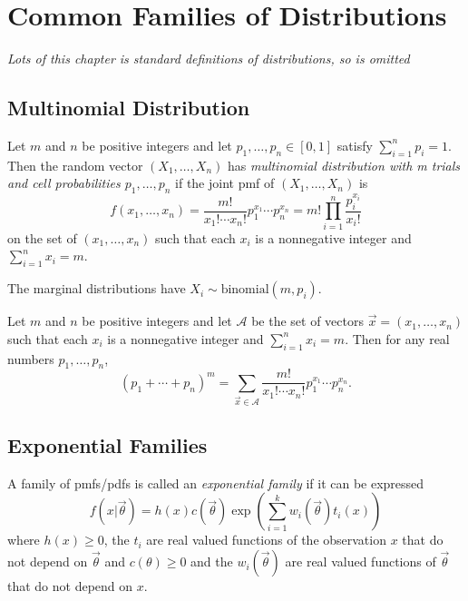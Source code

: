 \section{Common Families of Distributions}

\begin{center}
    \emph{Lots of this chapter is standard definitions of distributions, so is omitted}
\end{center}

\subsection{Multinomial Distribution}
\begin{definition}
    Let $m$ and $n$ be positive integers and let $p_1, \dots, p_n \in [0, 1]$ satisfy $\sum_{i=1}^n p_i = 1$. Then the random vector $(X_1, \dots, X_n)$ has \emph{multinomial distribution with m trials and cell probabilities $p_1, \dots, p_n$} if the joint pmf of $(X_1, \dots, X_n)$ is 
    \[
        f(x_1, \dots , x_n) = \frac{m!}{x_1! \cdots x_n!} p_1^{x_1} \cdots
p_n^{x_n} = m! \prod_{i=1}^n \frac{p_i^{x_i}}{x_i!} 
    \]
    on the set of $(x_1, \dots, x_n)$ such that each $x_i$ is a nonnegative integer and $\sum_{i=1}^n x_i = m$.
\end{definition}

\begin{remark}
    The marginal distributions have $X_i \sim \text{binomial}(m, p_i)$.
\end{remark}

\begin{theorem}
    Let $m$ and $n$ be positive integers and let $\mathcal{A}$ be the set of vectors $\vec{x} = (x_1, \dots, x_n)$ such that each $x_i$ is a nonnegative integer and $\sum_{i=1}^n x_i = m$. Then for any real numbers $p_1, \dots, p_n$,
    \[
        (p_1 + \cdots + p_n)^m = \sum_{\vec{x} \in \mathcal{A}} \frac{m!}{x_1! \cdots x_n!} p_1^{x_1}\cdots p_n^{x_n}.
    \]
\end{theorem}


\subsection{Exponential Families}

\begin{definition}
    A family of pmfs/pdfs is called an \emph{exponential family} if it can be expressed
    \[
          f(x|\vec{\theta}) = h(x)c(\vec{\theta})\exp\left( \sum_{i=1}^k w_i(\vec{\theta}) t_i(x) \right)
    \]
    where $h(x) \geq 0$, the $t_i$ are real valued functions of the observation $x$ that do not depend on $\vec{\theta}$ and $c(\theta) \geq 0$ and the $w_i(\vec{\theta})$ are real valued functions of $\vec{\theta}$ that do not depend on $x$.
\end{definition}

